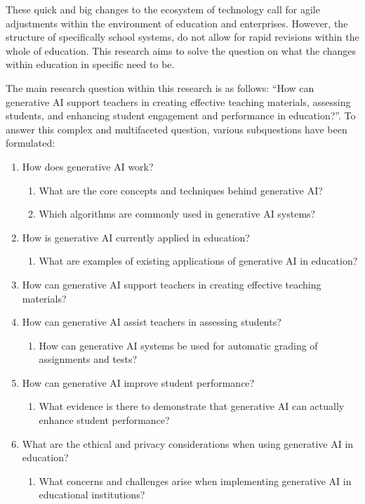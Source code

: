 \documentclass[a4paper,12pt]{report}
\begin{document}
These quick and big changes to the ecosystem of technology call for agile adjustments within the environment of education and enterprises. However, the structure of specifically school systems, do not allow for rapid revisions within the whole of education. This research aims to solve the question on what the changes within education in specific need to be.

The main research question within this research is as follows: “How can generative AI support teachers in creating effective teaching materials, assessing students, and enhancing student engagement and performance in education?”. To answer this complex and multifaceted question, various subquestions have been formulated:
\newpage

\begin{enumerate}
    \item How does generative AI work?
    \begin{enumerate}
        \item What are the core concepts and techniques behind generative AI?
        \item Which algorithms are commonly used in generative AI systems?
    \end{enumerate}
    \item How is generative AI currently applied in education?
    \begin{enumerate}
        \item What are examples of existing applications of generative AI in education?
    \end{enumerate}
    \item How can generative AI support teachers in creating effective teaching materials?
    \item How can generative AI assist teachers in assessing students?
    \begin{enumerate}
        \item How can generative AI systems be used for automatic grading of assignments and tests?
    \end{enumerate}
    \item How can generative AI improve student performance?
    \begin{enumerate}
        \item What evidence is there to demonstrate that generative AI can actually enhance student performance?
    \end{enumerate}
    \item What are the ethical and privacy considerations when using generative AI in education?
    \begin{enumerate}
        \item What concerns and challenges arise when implementing generative AI in educational institutions?
    \end{enumerate}
\end{enumerate}
\end{document}
